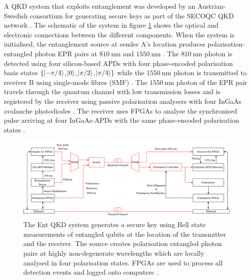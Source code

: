 A QKD system that exploits entanglement was developed by an Austrian-Swedish consortium for generating secure keys as part of the SECOQC QKD network \cite{peev2009secoqc}. The schematic of the system in figure \ref{fig:ent-qkd} shows the optical and electronic connections between the different components. When the system is initialised, the entanglement source at sender A's location produces polarisation-entangled photon EPR pairs at $\SI{810}{\nano\meter}$ and $\SI{1550}{\nano\meter}$ \cite{peev2009secoqc}. The $\SI{810}{\nano\meter}$ photon is detected using four silicon-based APDs with four phase-encoded polarisation basis states $\{\ket{-\pi/4}$,$\ket{0}$,$\ket{\pi/2}$,$\ket{\pi/4}\}$ while the $\SI{1550}{\nano\meter}$ photon is transmitted to receiver B using single-mode fibres (SMF) \cite{peev2009secoqc}. The $\SI{1550}{\nano\meter}$ photon of the EPR pair travels through the quantum channel with low transmission losses and is registered by the receiver using passive polarisation analysers with four InGaAs avalanche photodiodes \cite{peev2009secoqc}. The receiver uses FPGAs to analyse the synchronised pulse arriving at four InGaAs-APDs with the same phase-encoded polarisation states \cite{peev2009secoqc}. 
\begin{figure}[!ht]
	\centering
	\includegraphics[width=1.0\linewidth]{body/ch3/figs/ent-qkd}
	\caption[Schematic of the Ent Quantum Key Distribution System in the SECOQC Network by the Austrian Institute of Technology at the University of Vienna.]{The Ent QKD system generates a secure key using Bell state measurements of entangled qubits at the location of the transmitter and the receiver. The source creates polarisation entangled photon pairs at highly non-degenerate wavelengths which are locally analysed in four polarisation states. FPGAs are used to process all detection events and logged onto computers \cite{peev2009secoqc}.}
	\label{fig:ent-qkd}
\end{figure}
